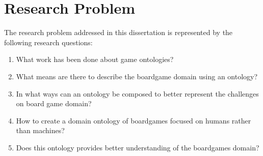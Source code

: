 
\section{Research Problem}

The research problem addressed in this dissertation is represented by the following research questions:
\begin{enumerate}
    \item {What work has been done about game ontologies?}
    \item {What means are there to describe the boardgame domain using an ontology?}
    \item {In what ways can an ontology be composed to better represent the challenges on board game domain?}
    \item {How to create a domain ontology of boardgames focused on humans rather than machines?}
    \item{Does this ontology provides better understanding of the boardgames domain?}
\end{enumerate}
